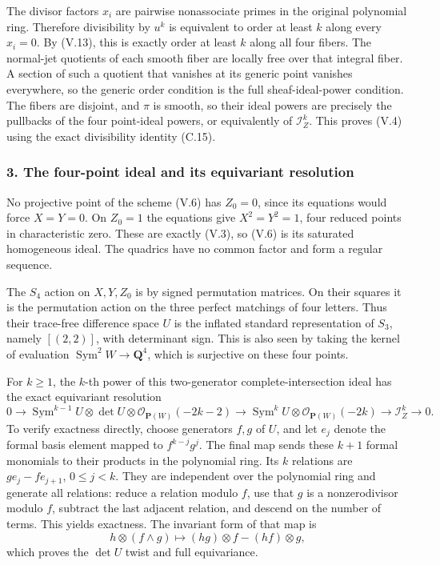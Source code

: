 \documentclass[
  10pt,
]{article}
\begin{document}
The divisor factors \(x_i\) are pairwise nonassociate primes in the
original polynomial ring. Therefore divisibility by \(u^k\) is
equivalent to order at least \(k\) along every \(x_i=0\). By (V.13),
this is exactly order at least \(k\) along all four fibers. The
normal-jet quotients of each smooth fiber are locally free over that
integral fiber. A section of such a quotient that vanishes at its
generic point vanishes everywhere, so the generic order condition is the
full sheaf-ideal-power condition. The fibers are disjoint, and \(\pi\)
is smooth, so their ideal powers are precisely the pullbacks of the four
point-ideal powers, or equivalently of \(\mathcal I_Z^k\). This proves
(V.4) using the exact divisibility identity (C.15).

\subsubsection{3. The four-point ideal and its equivariant
resolution}\label{the-four-point-ideal-and-its-equivariant-resolution}

No projective point of the scheme (V.6) has \(Z_0=0\), since its
equations would force \(X=Y=0\). On \(Z_0=1\) the equations give
\(X^2=Y^2=1\), four reduced points in characteristic zero. These are
exactly (V.3), so (V.6) is its saturated homogeneous ideal. The quadrics
have no common factor and form a regular sequence.

The \(S_4\) action on \(X,Y,Z_0\) is by signed permutation matrices. On
their squares it is the permutation action on the three perfect
matchings of four letters. Thus their trace-free difference space \(U\)
is the inflated standard representation of \(S_3\), namely \([(2,2)]\),
with determinant sign. This is also seen by taking the kernel of
evaluation \(\operatorname{Sym}^2W\to\mathbf Q^4\), which is surjective
on these four points.

For \(k\ge1\), the \(k\)-th power of this two-generator
complete-intersection ideal has the exact equivariant resolution \[
0\longrightarrow
\operatorname{Sym}^{k-1}U\otimes\det U\otimes
\mathcal O_{\mathbf P(W)}(-2k-2)
\longrightarrow
\operatorname{Sym}^{k}U\otimes
\mathcal O_{\mathbf P(W)}(-2k)
\longrightarrow
\mathcal I_Z^k\longrightarrow0.
\tag{V.14}
\] To verify exactness directly, choose generators \(f,g\) of \(U\), and
let \(e_j\) denote the formal basis element mapped to \(f^{k-j}g^j\).
The final map sends these \(k+1\) formal monomials to their products in
the polynomial ring. Its \(k\) relations are \(g e_j-f e_{j+1}\),
\(0\le j<k\). They are independent over the polynomial ring and generate
all relations: reduce a relation modulo \(f\), use that \(g\) is a
nonzerodivisor modulo \(f\), subtract the last adjacent relation, and
descend on the number of terms. This yields exactness. The invariant
form of that map is \[
h\otimes(f\wedge g)\longmapsto
(hg)\otimes f-(hf)\otimes g,
\] which proves the \(\det U\) twist and full equivariance.
\end{document}
